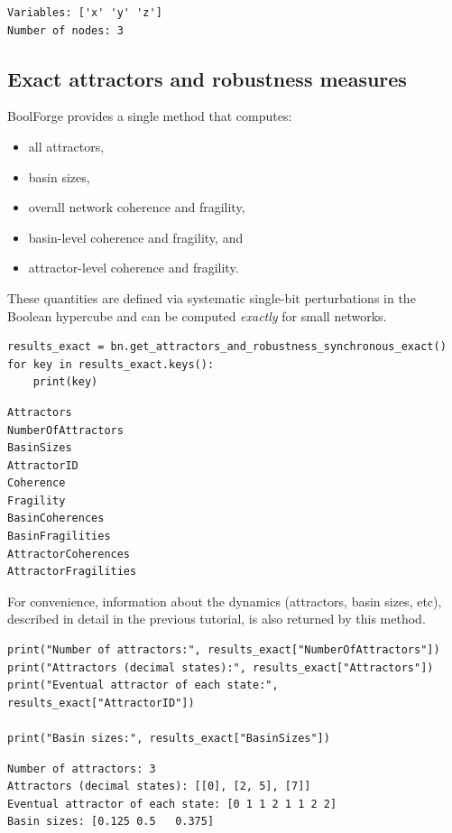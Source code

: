 \documentclass[
]{article}
\providecommand{\tightlist}{%
  \setlength{\itemsep}{0pt}\setlength{\parskip}{0pt}}
\begin{document}
\begin{lstlisting}
Variables: ['x' 'y' 'z']
Number of nodes: 3
\end{lstlisting}

\subsection{Exact attractors and robustness
measures}\label{exact-attractors-and-robustness-measures}

BoolForge provides a single method that computes:

\begin{itemize}
\tightlist
\item
  all attractors,
\item
  basin sizes,
\item
  overall network coherence and fragility,
\item
  basin-level coherence and fragility, and
\item
  attractor-level coherence and fragility.
\end{itemize}

These quantities are defined via systematic single-bit perturbations in
the Boolean hypercube and can be computed \emph{exactly} for small
networks.

\begin{lstlisting}
results_exact = bn.get_attractors_and_robustness_synchronous_exact()
for key in results_exact.keys():
    print(key)
\end{lstlisting}

\begin{lstlisting}
Attractors
NumberOfAttractors
BasinSizes
AttractorID
Coherence
Fragility
BasinCoherences
BasinFragilities
AttractorCoherences
AttractorFragilities
\end{lstlisting}

For convenience, information about the dynamics (attractors, basin
sizes, etc), described in detail in the previous tutorial, is also
returned by this method.

\begin{lstlisting}
print("Number of attractors:", results_exact["NumberOfAttractors"])
print("Attractors (decimal states):", results_exact["Attractors"])
print("Eventual attractor of each state:", results_exact["AttractorID"])

print("Basin sizes:", results_exact["BasinSizes"])
\end{lstlisting}

\begin{lstlisting}
Number of attractors: 3
Attractors (decimal states): [[0], [2, 5], [7]]
Eventual attractor of each state: [0 1 1 2 1 1 2 2]
Basin sizes: [0.125 0.5   0.375]
\end{lstlisting}
\end{document}

